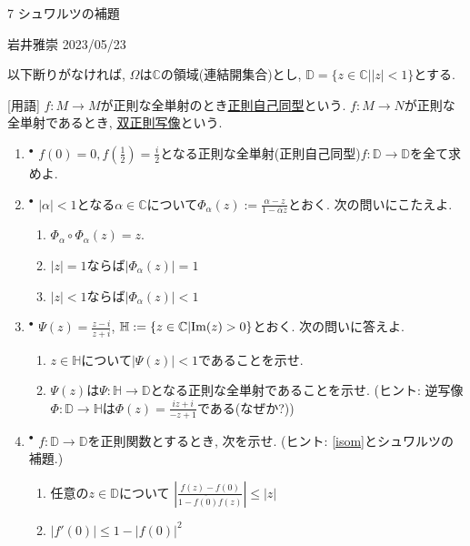 \documentclass[dvipdfmx,a4paper,11pt]{article}
\newcommand{\C}{\mathbb{C}}
\newcommand{\D}{\mathbb{D}}
\theoremstyle{definition}
\begin{document}

\begin{center}
{\Large 7 シュワルツの補題}
\end{center}

\begin{flushright}
 岩井雅崇 2023/05/23
\end{flushright}
以下断りがなければ, $\Omega$は$\C$の領域(連結開集合)とし, $\D=\{z \in \C |  |z| <1\}$とする. 

[用語] $f : M \to M$が正則な全単射のとき\underline{正則自己同型}という.
$f : M\to N$が正則な全単射であるとき, \underline{双正則写像}という.


\begin{enumerate}[label=\textbf{問}7.\arabic*]

\item$^{\bullet}$ $f(0)=0, f(\frac{1}{2})=\frac{i}{2}$となる正則な全単射(正則自己同型)$f : \D \to \D$を全て求めよ.

\item \label{isom} $^{\bullet}$ $|\alpha| <1$となる$\alpha \in \C$について$\Phi_{\alpha}(z) := \frac{\alpha - z}{1 - \bar{\alpha} z}$とおく. 次の問いにこたえよ. 
  \begin{enumerate}
\setlength{\parskip}{0cm} 
  \setlength{\itemsep}{0cm} 
  \item $\Phi_{\alpha} \circ \Phi_{\alpha}(z) =z$.
  \item $|z|=1$ならば$|\Phi_{\alpha}(z)|=1$
    \item $|z|<1$ならば$|\Phi_{\alpha}(z)| < 1$
\end{enumerate}

\item \label{HtoD}$^{\bullet}$ $\Psi(z) = \frac{z-i}{z+i}$, $\mathbb{H}:=\{ z \in \C | {\rm Im}(z) >0\}$とおく. 次の問いに答えよ.
  \begin{enumerate}
\setlength{\parskip}{0cm} 
  \setlength{\itemsep}{0cm} 
  \item $z \in \mathbb{H}$について$|\Psi(z)| <1$であることを示せ.
  \item $\Psi(z)$は$\Psi :  \mathbb{H} \to \D$となる正則な全単射であることを示せ. (ヒント: 逆写像$\Phi : \D \to \mathbb{H}$は$\Phi(z)=\frac{iz + i}{-z +1}$である(なぜか?))
  \end{enumerate}
  
\item $^{\bullet}$ $f : \D \to \D$を正則関数とするとき, 次を示せ. (ヒント: \ref{isom}とシュワルツの補題.)
  \begin{enumerate}
\setlength{\parskip}{0cm} 
  \setlength{\itemsep}{0cm} 
  \item 任意の$z \in \D$について
  $
  \left|\frac{f(z) - f(0)}{1 - \overline{f(0)} f(z)}\right| \le |z|
  $
  \item $|f' (0)| \le 1 - |f(0)|^2$
    \end{enumerate}
    

\end{enumerate}
\end{document}
